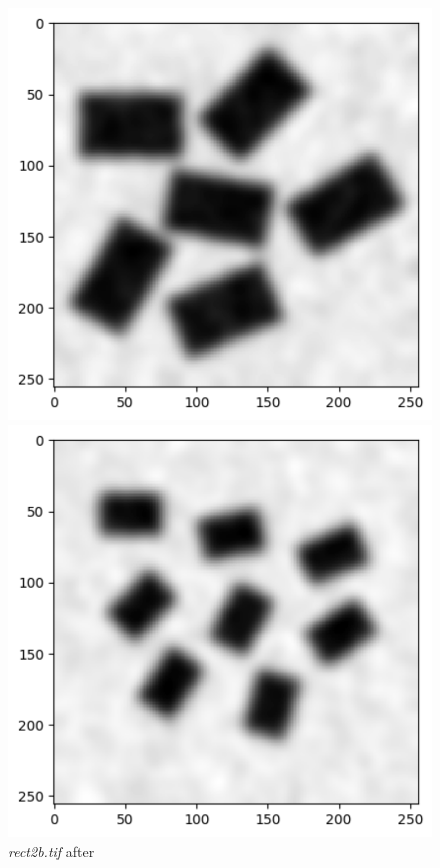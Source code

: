 \documentclass[runningheads]{llncs}
\begin{document}
\begin{figure}[h!]
\begin{minipage}[h]{0.47\linewidth}
\begin{center}
\includegraphics[width=1\linewidth]{Report/Result_Images/image_hb6.png} 
\caption{\emph{rect2b.tif} after}
\label{hb6-Gaussian and Kernel 5}
\end{center}
\end{minipage}
\vfill
\vspace{0.2 cm}
\begin{minipage}[h]{0.47\linewidth}
\begin{center}
\includegraphics[width=1\linewidth]{Report/Result_Images/image_hb7.png} 

\end{center}
\end{minipage}
\end{figure}
\end{document}
